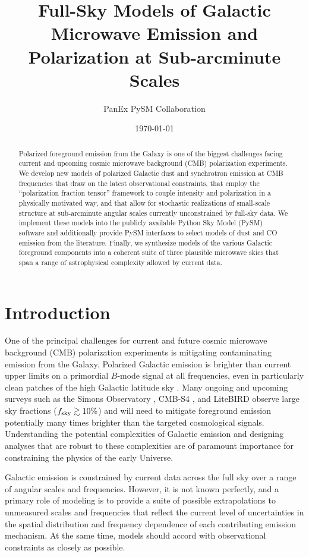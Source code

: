 \documentclass[twocolumn]{aastex631}
\begin{document}
\title{Full-Sky Models of Galactic Microwave Emission and Polarization at Sub-arcminute Scales}
\author{PanEx PySM Collaboration}
\date{\today}

\begin{abstract}
Polarized foreground emission from the Galaxy is one of the biggest challenges facing current and upcoming cosmic microwave background (CMB) polarization experiments. We develop new models of polarized Galactic dust and synchrotron emission at CMB frequencies that draw on the latest observational constraints, that employ the ``polarization fraction tensor'' framework to couple intensity and polarization in a physically motivated way, and that allow for stochastic realizations of small-scale structure at sub-arcminute angular scales currently unconstrained by full-sky data. We implement these models into the publicly available Python Sky Model (PySM) software and additionally provide PySM interfaces to select models of dust and CO emission from the literature. Finally, we synthesize models of the various Galactic foreground components into a coherent suite of three plausible microwave skies that span a range of astrophysical complexity allowed by current data.
\end{abstract}

\section{Introduction}
One of the principal challenges for current and future cosmic microwave background (CMB) polarization experiments is mitigating contaminating emission from the Galaxy. Polarized Galactic emission is brighter than current upper limits on a primordial $B$-mode signal at all frequencies, even in particularly clean patches of the high Galactic latitude sky \citep{planck2016-l11A}. Many ongoing and upcoming surveys such as the Simons Observatory \citep{Ade:2019}, CMB-S4 \citep{Abazajian:2022}, and LiteBIRD \citep{LiteBIRDCollaboration:2023} observe large sky fractions ($f_{\rm sky} \gtrsim 10\%$) and will need to mitigate foreground emission potentially many times brighter than the targeted cosmological signals. Understanding the potential complexities of Galactic emission and designing analyses that are robust to these complexities are of paramount importance for constraining the physics of the early Universe.

Galactic emission is constrained by current data across the full sky over a range of angular scales and frequencies. However, it is not known perfectly, and a primary role of modeling is to provide a suite of possible extrapolations to unmeasured scales and frequencies that reflect the current level of uncertainties in the spatial distribution and frequency dependence of each contributing emission mechanism. At the same time, models should accord with observational constraints as closely as possible.
\end{document}
